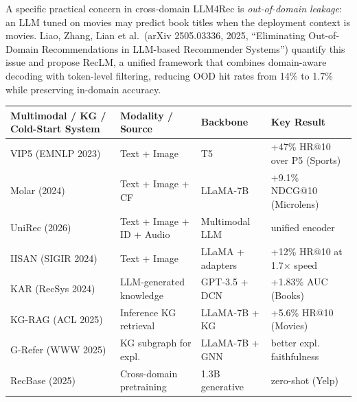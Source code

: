 A specific practical concern in cross-domain LLM4Rec is \emph{out-of-domain leakage}: an LLM tuned on movies may predict book titles when the deployment context is movies. Liao, Zhang, Lian et al.~(arXiv 2505.03336, 2025, ``Eliminating Out-of-Domain Recommendations in LLM-based Recommender Systems'') quantify this issue and propose RecLM, a unified framework that combines domain-aware decoding with token-level filtering, reducing OOD hit rates from 14\% to 1.7\% while preserving in-domain accuracy.

{\def\LTcaptype{none} %
\begin{longtable}[]{@{}
  >{\raggedright\arraybackslash}p{}
  >{\raggedright\arraybackslash}p{}
  >{\raggedright\arraybackslash}p{}
  >{\raggedright\arraybackslash}p{}@{}}
\toprule\noalign{}
\begin{minipage}[b]{\linewidth}\raggedright
Multimodal / KG / Cold-Start System
\end{minipage} & \begin{minipage}[b]{\linewidth}\raggedright
Modality / Source
\end{minipage} & \begin{minipage}[b]{\linewidth}\raggedright
Backbone
\end{minipage} & \begin{minipage}[b]{\linewidth}\raggedright
Key Result
\end{minipage} \\
\midrule\noalign{}
\endhead
\bottomrule\noalign{}
\endlastfoot
VIP5 (EMNLP 2023) & Text + Image & T5 & +47\% HR@10 over P5 (Sports) \\
Molar (2024) & Text + Image + CF & LLaMA-7B & +9.1\% NDCG@10 (Microlens) \\
UniRec (2026) & Text + Image + ID + Audio & Multimodal LLM & unified encoder \\
IISAN (SIGIR 2024) & Text + Image & LLaMA + adapters & +12\% HR@10 at 1.7× speed \\
KAR (RecSys 2024) & LLM-generated knowledge & GPT-3.5 + DCN & +1.83\% AUC (Books) \\
KG-RAG (ACL 2025) & Inference KG retrieval & LLaMA-7B + KG & +5.6\% HR@10 (Movies) \\
G-Refer (WWW 2025) & KG subgraph for expl. & LLaMA-7B + GNN & better expl. faithfulness \\
RecBase (2025) & Cross-domain pretraining & 1.3B generative & 0.0784 zero-shot (Yelp) \\

\end{longtable}}
